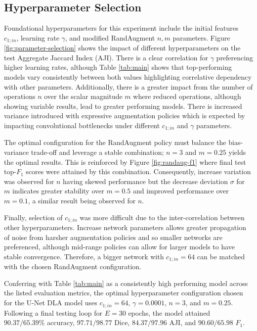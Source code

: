 \subsection{Hyperparameter Selection}

Foundational hyperparameters for this experiment include the initial features $c_{1;in}$, learning rate $\gamma$, and modified RandAugment $n,m$ parameters. Figure \ref{fig:parameter-selection} shows the impact of different hyperparameters on the test Aggregate Jaccard Index (AJI). There is a clear correlation for $\gamma$ preferencing higher learning rates, although Table \ref{tab:main} shows that top-performing models vary consistently between both values highlighting correlative dependency with other parameters. Additionally, there is a greater impact from the number of operations $n$ over the scalar magnitude $m$ where reduced operations, although showing variable results, lead to greater performing models. There is increased variance introduced with expressive augmentation policies which is expected by impacting convolutional bottlenecks under different $c_{1;in}$ and $\gamma$ parameters. 

The optimal configuration for the RandAugment policy must balance the bias-variance trade-off and leverage a stable combination; $n=3$ and $m=0.25$ yields the optimal results. This is reinforced by Figure \ref{fig:randaug-f1} where final test top-$F_1$ scores were attained by this combination. Consequently, increase variation was observed for $n$ having skewed performance but the decrease deviation $\sigma$ for $m$ indicates greater stability over $m=0.5$ and improved performance over $m=0.1$, a similar result being observed for $n$. 

Finally, selection of $c_{1;in}$ was more difficult due to the inter-correlation between other hyperparameters. Increase network parameters allows greater propagation of noise from harsher augmentation policies and so smaller networks are preferenced, although mid-range policies can allow for larger models to have stable convergence. Therefore, a bigger network with $c_{1;in} = 64$ can be matched with the chosen RandAugment configuration. 

Conferring with Table \ref{tab:main} as a consistently high performing model across the listed evaluation metrics, the optimal hyperparameter configuration chosen for the U-Net DLA model uses $c_{1;in}=64$, $\gamma=0.0001$, $n=3$, and $m=0.25$. Following a final testing loop for $E=30$ epochs, the model attained $90.37/65.39\%$ accuracy, $97.71/98.77$ Dice, $84.37/97.96$ AJI, and $90.60/65.98$ $F_1$.


